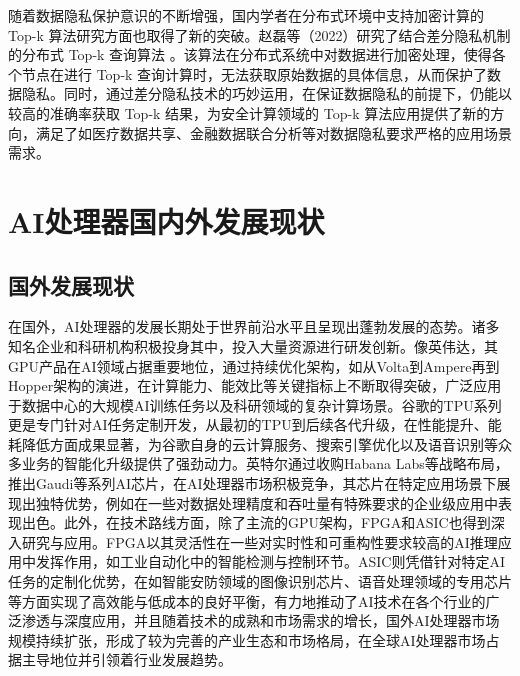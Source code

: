 随着数据隐私保护意识的不断增强，国内学者在分布式环境中支持加密计算的 Top-k 算法研究方面也取得了新的突破。赵磊等（2022）研究了结合差分隐私机制的分布式 Top-k 查询算法 \cite {zhao2022privacy}。该算法在分布式系统中对数据进行加密处理，使得各个节点在进行 Top-k 查询计算时，无法获取原始数据的具体信息，从而保护了数据隐私。同时，通过差分隐私技术的巧妙运用，在保证数据隐私的前提下，仍能以较高的准确率获取 Top-k 结果，为安全计算领域的 Top-k 算法应用提供了新的方向，满足了如医疗数据共享、金融数据联合分析等对数据隐私要求严格的应用场景需求。

\section{AI处理器国内外发展现状}

\subsection{国外发展现状}
在国外，AI处理器的发展长期处于世界前沿水平且呈现出蓬勃发展的态势。诸多知名企业和科研机构积极投身其中，投入大量资源进行研发创新。像英伟达，其GPU产品在AI领域占据重要地位，通过持续优化架构，如从Volta到Ampere再到Hopper架构的演进，在计算能力、能效比等关键指标上不断取得突破，广泛应用于数据中心的大规模AI训练任务以及科研领域的复杂计算场景。谷歌的TPU系列更是专门针对AI任务定制开发，从最初的TPU到后续各代升级，在性能提升、能耗降低方面成果显著，为谷歌自身的云计算服务、搜索引擎优化以及语音识别等众多业务的智能化升级提供了强劲动力。英特尔通过收购Habana Labs等战略布局，推出Gaudi等系列AI芯片，在AI处理器市场积极竞争，其芯片在特定应用场景下展现出独特优势，例如在一些对数据处理精度和吞吐量有特殊要求的企业级应用中表现出色。此外，在技术路线方面，除了主流的GPU架构，FPGA和ASIC也得到深入研究与应用。FPGA以其灵活性在一些对实时性和可重构性要求较高的AI推理应用中发挥作用，如工业自动化中的智能检测与控制环节。ASIC则凭借针对特定AI任务的定制化优势，在如智能安防领域的图像识别芯片、语音处理领域的专用芯片等方面实现了高效能与低成本的良好平衡，有力地推动了AI技术在各个行业的广泛渗透与深度应用，并且随着技术的成熟和市场需求的增长，国外AI处理器市场规模持续扩张，形成了较为完善的产业生态和市场格局，在全球AI处理器市场占据主导地位并引领着行业发展趋势。

